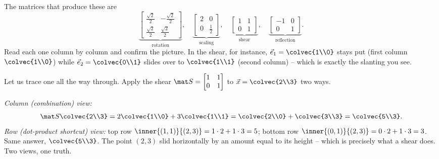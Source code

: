 The matrices that produce these are
\[
\underbrace{\begin{bmatrix} \tfrac{\sqrt2}{2} & -\tfrac{\sqrt2}{2}\\[2pt] \tfrac{\sqrt2}{2} & \tfrac{\sqrt2}{2}\end{bmatrix}}_{\text{rotation}},\quad
\underbrace{\begin{bmatrix} 2 & 0\\ 0 & \tfrac12\end{bmatrix}}_{\text{scaling}},\quad
\underbrace{\begin{bmatrix} 1 & 1\\ 0 & 1\end{bmatrix}}_{\text{shear}},\quad
\underbrace{\begin{bmatrix} -1 & 0\\ 0 & 1\end{bmatrix}}_{\text{reflection}}.
\]
Read each one column by column and confirm the picture. In the shear, for instance, $\vec e_1=\colvec{1\\0}$
stays put (first column $\colvec{1\\0}$) while $\vec e_2=\colvec{0\\1}$ slides over to $\colvec{1\\1}$
(second column) -- which is exactly the slanting you see.

\begin{example}
Let us trace one all the way through. Apply the shear $\mat S = \begin{bmatrix}1&1\\0&1\end{bmatrix}$ to
$\vec x=\colvec{2\\3}$ two ways.

\emph{Column (combination) view:}
\[
\mat S\colvec{2\\3} = 2\colvec{1\\0} + 3\colvec{1\\1} = \colvec{2\\0}+\colvec{3\\3}=\colvec{5\\3}.
\]
\emph{Row (dot-product shortcut) view:} top row $\inner{(1,1)}{(2,3)} = 1\cdot2+1\cdot3 = 5$; bottom
row $\inner{(0,1)}{(2,3)} = 0\cdot2+1\cdot3 = 3$. Same answer, $\colvec{5\\3}$. The point $(2,3)$ slid
horizontally by an amount equal to its height -- which is precisely what a shear does. Two views, one
truth.
\end{example}


